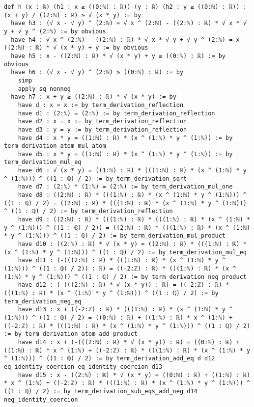 \documentclass{article}
\begin{document}
\begin{tcolorbox}[colback=white!10, width=\linewidth]
\begin{lstlisting}[language=Lean4]
def h (x : ℝ) (h1 : x ≥ ((0:ℕ) : ℝ)) (y : ℝ) (h2 : y ≥ ((0:ℕ) : ℝ)) : (x + y) / ((2:ℕ) : ℝ) ≥ √ (x * y) := by
  have h3 : (√ x - √ y) ^ (2:ℕ) = √ x ^ (2:ℕ) - ((2:ℕ) : ℝ) * √ x * √ y + √ y ^ (2:ℕ) := by obvious
  have h4 : √ x ^ (2:ℕ) - ((2:ℕ) : ℝ) * √ x * √ y + √ y ^ (2:ℕ) = x - ((2:ℕ) : ℝ) * √ (x * y) + y := by obvious
  have h5 : x - ((2:ℕ) : ℝ) * √ (x * y) + y ≥ ((0:ℕ) : ℝ) := by obvious
  have h6 : (√ x - √ y) ^ (2:ℕ) ≥ ((0:ℕ) : ℝ) := by
    simp
    apply sq_nonneg
  have h7 : x + y ≥ ((2:ℕ) : ℝ) * √ (x * y) := by
    have d : x = x := by term_derivation_reflection
    have d1 : (2:ℕ) = (2:ℕ) := by term_derivation_reflection
    have d2 : x = x := by term_derivation_reflection
    have d3 : y = y := by term_derivation_reflection
    have d4 : x * y = ((1:ℕ) : ℝ) * (x ^ (1:ℕ) * y ^ (1:ℕ)) := by term_derivation_atom_mul_atom
    have d5 : x * y = ((1:ℕ) : ℝ) * (x ^ (1:ℕ) * y ^ (1:ℕ)) := by term_derivation_mul_eq
    have d6 : √ (x * y) = ((1:ℕ) : ℝ) * (((1:ℕ) : ℝ) * (x ^ (1:ℕ) * y ^ (1:ℕ))) ^ ((1 : ℚ) / 2) := by term_derivation_sqrt
    have d7 : (2:ℕ) * (1:ℕ) = (2:ℕ) := by term_derivation_mul_one
    have d8 : ((2:ℕ) : ℝ) * (((1:ℕ) : ℝ) * (x ^ (1:ℕ) * y ^ (1:ℕ))) ^ ((1 : ℚ) / 2) = ((2:ℕ) : ℝ) * (((1:ℕ) : ℝ) * (x ^ (1:ℕ) * y ^ (1:ℕ))) ^ ((1 : ℚ) / 2) := by term_derivation_reflection
    have d9 : ((2:ℕ) : ℝ) * (((1:ℕ) : ℝ) * (((1:ℕ) : ℝ) * (x ^ (1:ℕ) * y ^ (1:ℕ))) ^ ((1 : ℚ) / 2)) = ((2:ℕ) : ℝ) * (((1:ℕ) : ℝ) * (x ^ (1:ℕ) * y ^ (1:ℕ))) ^ ((1 : ℚ) / 2) := by term_derivation_mul_product
    have d10 : ((2:ℕ) : ℝ) * √ (x * y) = ((2:ℕ) : ℝ) * (((1:ℕ) : ℝ) * (x ^ (1:ℕ) * y ^ (1:ℕ))) ^ ((1 : ℚ) / 2) := by term_derivation_mul_eq
    have d11 : (-(((2:ℕ) : ℝ) * (((1:ℕ) : ℝ) * (x ^ (1:ℕ) * y ^ (1:ℕ))) ^ ((1 : ℚ) / 2)) : ℝ) = ((-2:ℤ) : ℝ) * (((1:ℕ) : ℝ) * (x ^ (1:ℕ) * y ^ (1:ℕ))) ^ ((1 : ℚ) / 2) := by term_derivation_neg_product
    have d12 : (-(((2:ℕ) : ℝ) * √ (x * y)) : ℝ) = ((-2:ℤ) : ℝ) * (((1:ℕ) : ℝ) * (x ^ (1:ℕ) * y ^ (1:ℕ))) ^ ((1 : ℚ) / 2) := by term_derivation_neg_eq
    have d13 : x + ((-2:ℤ) : ℝ) * (((1:ℕ) : ℝ) * (x ^ (1:ℕ) * y ^ (1:ℕ))) ^ ((1 : ℚ) / 2) = ((0:ℕ) : ℝ) + ((1:ℕ) : ℝ) * x ^ (1:ℕ) + ((-2:ℤ) : ℝ) * (((1:ℕ) : ℝ) * (x ^ (1:ℕ) * y ^ (1:ℕ))) ^ ((1 : ℚ) / 2) := by term_derivation_atom_add_product
    have d14 : x + (-(((2:ℕ) : ℝ) * √ (x * y)) : ℝ) = ((0:ℕ) : ℝ) + ((1:ℕ) : ℝ) * x ^ (1:ℕ) + ((-2:ℤ) : ℝ) * (((1:ℕ) : ℝ) * (x ^ (1:ℕ) * y ^ (1:ℕ))) ^ ((1 : ℚ) / 2) := by term_derivation_add_eq d d12 eq_identity_coercion eq_identity_coercion d13
    have d15 : x - ((2:ℕ) : ℝ) * √ (x * y) = ((0:ℕ) : ℝ) + ((1:ℕ) : ℝ) * x ^ (1:ℕ) + ((-2:ℤ) : ℝ) * (((1:ℕ) : ℝ) * (x ^ (1:ℕ) * y ^ (1:ℕ))) ^ ((1 : ℚ) / 2) := by term_derivation_sub_eqs_add_neg d14 neg_identity_coercion

\end{lstlisting}
\end{tcolorbox}
\end{document}
